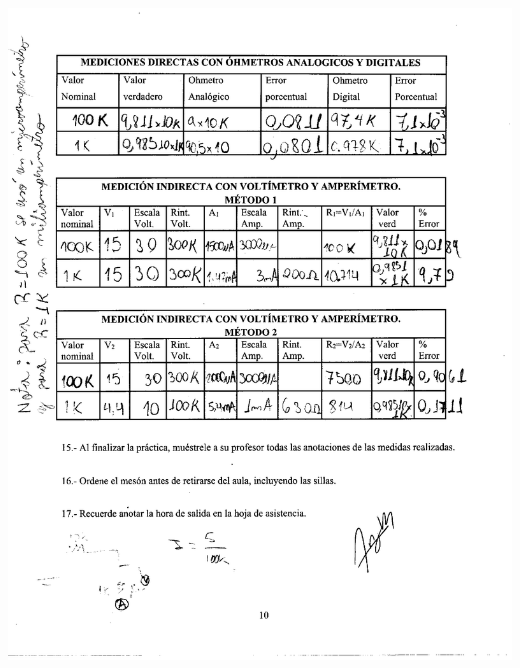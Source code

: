 \documentclass[12pt]{article}
\begin{document}
	\begin{center}
		\includegraphics[width=16cm,height=20cm]{Img/datos_lab_0007}
	\end{center}
\end{document}
